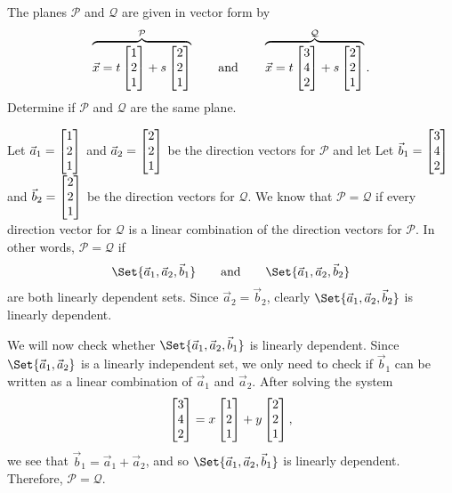 \begin{example}
	The planes $\mathcal P$ and $\mathcal Q$ are given in vector form by
	\[
		\overbrace{\vec x=t\mat{1\\2\\1}+s\mat{2\\2\\1}}^{\mathcal P}
		\qquad\text{and}\qquad
		\overbrace{\vec x=t\mat{3\\4\\2}+s\mat{2\\2\\1}}^{\mathcal Q}.
	\]
	Determine if $\mathcal P$ and $\mathcal Q$ are the same plane.

	Let $\vec a_1=\mat{1\\2\\1}$ and $\vec a_2=\mat{2\\2\\1}$ be the direction vectors
	for $\mathcal P$ and let 
	Let $\vec b_1=\mat{3\\4\\2}$ and $\vec b_2=\mat{2\\2\\1}$ be the direction vectors
	for $\mathcal Q$. We know that $\mathcal P=\mathcal Q$ if every direction vector for $\mathcal Q$
	is a linear combination of the direction vectors for $\mathcal P$. In other words, 
	$\mathcal P=\mathcal Q$ if
	\[
		\Set{\vec a_1,\vec a_2,\vec b_1}\qquad\text{and}\qquad \Set{\vec a_1,\vec a_2,\vec b_2}
	\]
	are both linearly dependent sets. Since $\vec a_2=\vec b_2$, clearly $\Set{\vec a_1,\vec a_2,\vec b_2}$
	is linearly dependent. 

	We will now check whether $\Set{\vec a_1,\vec a_2,\vec b_1}$ is linearly dependent. Since $\Set{\vec a_1,\vec a_2}$
	is a linearly independent set, we only need to check if $\vec b_1$ can be written as a linear combination of $\vec a_1$ and $\vec a_2$.
	After solving the system
	\[
		\mat{3\\4\\2}=x\mat{1\\2\\1}+y\mat{2\\2\\1},
	\]
	we see that $\vec b_1=\vec a_1+\vec a_2$, and so $\Set{\vec a_1,\vec a_2,\vec b_1}$ is linearly dependent. Therefore,
	$\mathcal P=\mathcal Q$.
\end{example}

